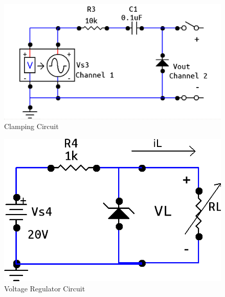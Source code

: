 \documentclass[twocolumn,english]{IEEEtran}
\begin{document}
  \begin{figure}[htpb]
  \begin{centering}
  \begin{center}
  \includegraphics[width=\linewidth]{./Images/3a.png}
  \caption{Clamping Circuit}
  \label{fig:circuit_2}
  \end{center}
  \par\end{centering}
  \end{figure}

  \begin{figure}[htpb]
  \begin{centering}
  \begin{center}
  \includegraphics[width=\linewidth]{./Images/3.png}
  \caption{Voltage Regulator Circuit}
  \label{fig:circuit_3}
  \end{center}
  \par\end{centering}
  \end{figure}
\end{document}
